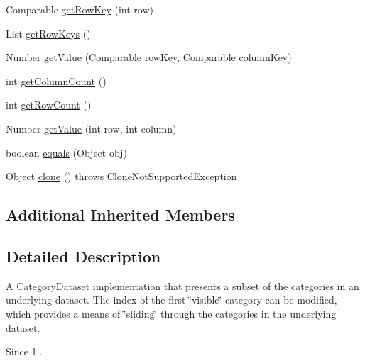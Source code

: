 \begin{DoxyCompactItemize}
Comparable \mbox{\hyperlink{classorg_1_1jfree_1_1data_1_1category_1_1_sliding_category_dataset_a6fcf1e054f8df00a8d37ea3b6eb0960a}{get\+Row\+Key}} (int row)
\item 
List \mbox{\hyperlink{classorg_1_1jfree_1_1data_1_1category_1_1_sliding_category_dataset_afac3ef11a6f20fcbae0b573ce8d9562e}{get\+Row\+Keys}} ()
\item 
Number \mbox{\hyperlink{classorg_1_1jfree_1_1data_1_1category_1_1_sliding_category_dataset_a18db7dd73ce5bd7e83174d8bc2db6e80}{get\+Value}} (Comparable row\+Key, Comparable column\+Key)
\item 
int \mbox{\hyperlink{classorg_1_1jfree_1_1data_1_1category_1_1_sliding_category_dataset_aaa350568675875cc8c70dddd3c5d6d79}{get\+Column\+Count}} ()
\item 
int \mbox{\hyperlink{classorg_1_1jfree_1_1data_1_1category_1_1_sliding_category_dataset_a481c79a7d0e11052061f04089b36c18c}{get\+Row\+Count}} ()
\item 
Number \mbox{\hyperlink{classorg_1_1jfree_1_1data_1_1category_1_1_sliding_category_dataset_a58d00a9725b902d17505e968469d9843}{get\+Value}} (int row, int column)
\item 
boolean \mbox{\hyperlink{classorg_1_1jfree_1_1data_1_1category_1_1_sliding_category_dataset_a6dc6aeef2454ad771c4ff5c11d46a302}{equals}} (Object obj)
\item 
Object \mbox{\hyperlink{classorg_1_1jfree_1_1data_1_1category_1_1_sliding_category_dataset_ac560c9ec4801908da7654268d03313a2}{clone}} ()  throws Clone\+Not\+Supported\+Exception 
\end{DoxyCompactItemize}
\subsection*{Additional Inherited Members}


\subsection{Detailed Description}
A \mbox{\hyperlink{interfaceorg_1_1jfree_1_1data_1_1category_1_1_category_dataset}{Category\+Dataset}} implementation that presents a subset of the categories in an underlying dataset. The index of the first \char`\"{}visible\char`\"{} category can be modified, which provides a means of \char`\"{}sliding\char`\"{} through the categories in the underlying dataset.

\begin{DoxySince}{Since}
1.. 
\end{DoxySince}


